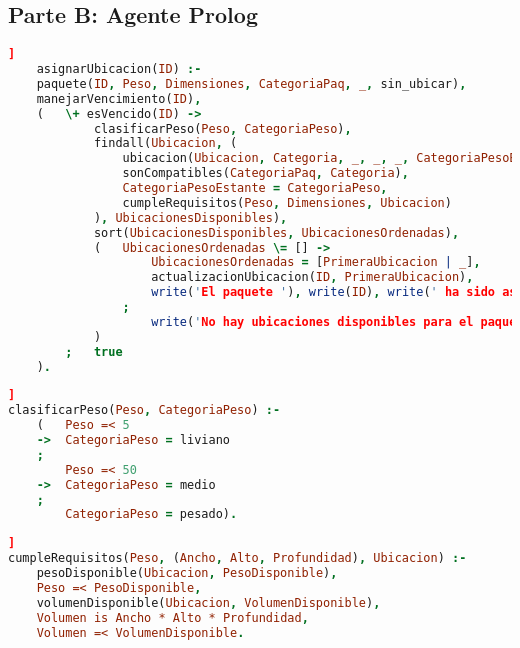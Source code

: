 \documentclass[12pt]{article}
\begin{document}
\subsection{Parte B: Agente Prolog}

\begin{lstlisting}[language=Prolog, caption={Asignacion de ubicaciones para los paquetes}, label={lst:asignarUbicacion}]]
    asignarUbicacion(ID) :-
    paquete(ID, Peso, Dimensiones, CategoriaPaq, _, sin_ubicar),
    manejarVencimiento(ID),
    (   \+ esVencido(ID) ->
            clasificarPeso(Peso, CategoriaPeso),
            findall(Ubicacion, (
                ubicacion(Ubicacion, Categoria, _, _, _, CategoriaPesoEstante),
                sonCompatibles(CategoriaPaq, Categoria),
                CategoriaPesoEstante = CategoriaPeso,
                cumpleRequisitos(Peso, Dimensiones, Ubicacion)
            ), UbicacionesDisponibles),
            sort(UbicacionesDisponibles, UbicacionesOrdenadas),
            (   UbicacionesOrdenadas \= [] ->
                    UbicacionesOrdenadas = [PrimeraUbicacion | _],
                    actualizacionUbicacion(ID, PrimeraUbicacion),
                    write('El paquete '), write(ID), write(' ha sido asignado a la ubicacion '), write(PrimeraUbicacion), nl
                ;
                    write('No hay ubicaciones disponibles para el paquete '), write(ID), nl
            )
        ;   true
    ).

\end{lstlisting}


\begin{lstlisting}[language=Prolog, caption={Clasificar el peso de un paquete}, label={lst:clasificarPeso}]]
clasificarPeso(Peso, CategoriaPeso) :-
    (   Peso =< 5
    ->  CategoriaPeso = liviano
    ;   
        Peso =< 50
    ->  CategoriaPeso = medio
    ;   
        CategoriaPeso = pesado).

\end{lstlisting}

\begin{lstlisting}[language=Prolog, caption={Verificar si una ubicación cumple con los requisitos de un paquete}, label={lst:cumpleRequisitos}]]
cumpleRequisitos(Peso, (Ancho, Alto, Profundidad), Ubicacion) :-
    pesoDisponible(Ubicacion, PesoDisponible),
    Peso =< PesoDisponible,
    volumenDisponible(Ubicacion, VolumenDisponible),
    Volumen is Ancho * Alto * Profundidad,
    Volumen =< VolumenDisponible.


\end{lstlisting}
\end{document}
